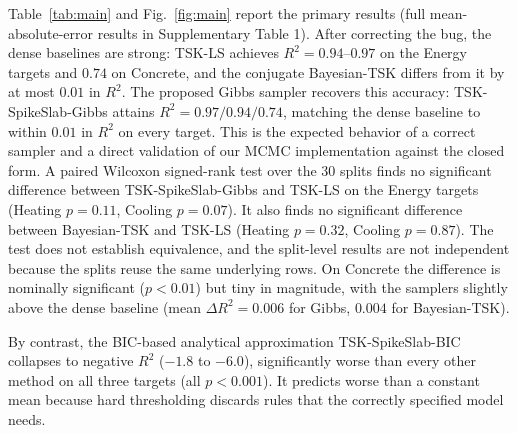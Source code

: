 \documentclass[review,1p,times]{elsarticle}
\begin{document}
Table~\ref{tab:main} and Fig.~\ref{fig:main} report the primary results (full mean-absolute-error results in Supplementary Table 1). After correcting the bug, the dense baselines are strong: TSK-LS achieves $R^2=0.94$--$0.97$ on the Energy targets and $0.74$ on Concrete, and the conjugate Bayesian-TSK differs from it by at most $0.01$ in $R^2$.
The proposed Gibbs sampler recovers this accuracy: TSK-SpikeSlab-Gibbs attains $R^2=0.97/0.94/0.74$, matching the dense baseline to within $0.01$ in $R^2$ on every target.
This is the expected behavior of a correct sampler and a direct validation of our MCMC implementation against the closed form.
A paired Wilcoxon signed-rank test over the 30 splits \cite{wilcoxon1945individual} finds no significant difference between TSK-SpikeSlab-Gibbs and TSK-LS on the Energy targets (Heating $p=0.11$, Cooling $p=0.07$).
It also finds no significant difference between Bayesian-TSK and TSK-LS (Heating $p=0.32$, Cooling $p=0.87$).
The test does not establish equivalence, and the split-level results are not independent because the splits reuse the same underlying rows. On Concrete the difference is nominally significant ($p<0.01$) but tiny in magnitude, with the samplers slightly above the dense baseline (mean $\Delta R^2=0.006$ for Gibbs, $0.004$ for Bayesian-TSK).

By contrast, the BIC-based analytical approximation TSK-SpikeSlab-BIC collapses to negative $R^2$ ($-1.8$ to $-6.0$), significantly worse than every other method on all three targets (all $p<0.001$).
It predicts worse than a constant mean because hard thresholding discards rules that the correctly specified model needs.
\end{document}
